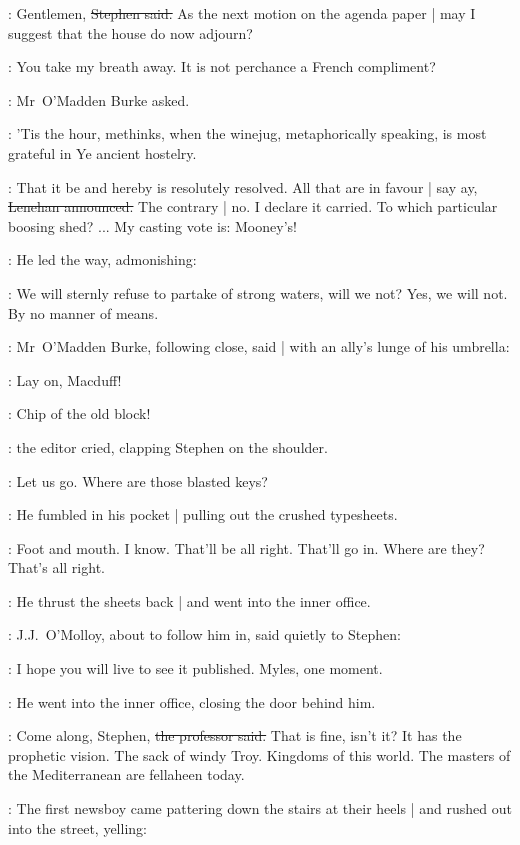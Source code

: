 \Stephen:
Gentlemen,
\sout{Stephen said.}
As the next motion on the agenda paper |
may I suggest that the house do now adjourn?

\omaddenburke:
You take my breath away.
It is not perchance a French compliment?

:
Mr~O'Madden Burke asked.

\omaddenburke:
'Tis the hour,
methinks,
when the winejug,
metaphorically speaking,
is most grateful in Ye ancient hostelry.

\lenehan:
That it be and hereby is resolutely resolved.
All that are in favour |
say ay,
\sout{Lenehan announced.}
The contrary |
no.
I declare it carried.
To which particular boosing shed? ...
My casting vote is:
Mooney's!

:
He led the way,
admonishing:

\lenehan:
We will sternly refuse to partake of strong waters,
will we not?
Yes, we will not.
By no manner of means.

:
Mr~O'Madden Burke,
following close,
said |
with an ally's lunge of his umbrella:

\omaddenburke:
Lay on, Macduff!

\crawford:
Chip of the old block!

:
the editor cried,
clapping Stephen on the shoulder.

\crawford:
Let us go.
Where are those blasted keys?

:
He fumbled in his pocket |
pulling out the crushed typesheets.

\crawford:
Foot and mouth.
I know.
That'll be all right.
That'll go in.
Where are they?
That's all right.

:
He thrust the sheets back |
and went into the inner office.



:
J.J.~O'Molloy,
about to follow him in,
said quietly to Stephen:

\jjom:
I hope you will live to see it published.
Myles, one moment.

:
He went into the inner office,
closing the door behind him.

\machugh:
Come along, Stephen,
\sout{the professor said.}
That is fine, isn't it?
It has the prophetic vision.
The sack of windy Troy.
Kingdoms of this world.
The masters of the Mediterranean are fellaheen today.

:
The first newsboy came pattering down the stairs at their heels |
and rushed out into the street,
yelling:


